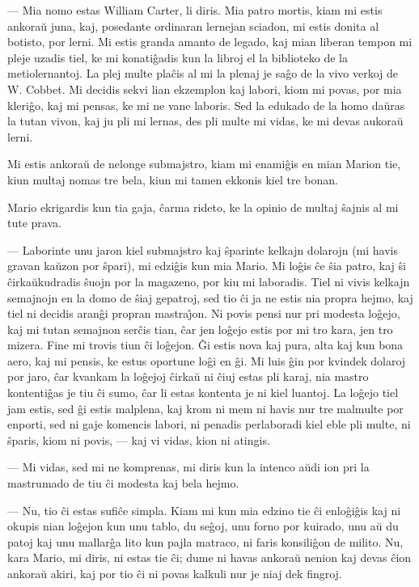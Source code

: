  --- Mia nomo estas William Carter, li diris. Mia patro mortis, kiam
mi estis ankora\u u juna, kaj, posedante ordinaran lernejan sciadon,
mi estis donita al botisto, por lerni. Mi estis granda amanto de
legado, kaj mian liberan tempon mi pleje uzadis tiel, ke mi
konati\^gadis kun la libroj el la biblioteko de la metiolernantoj.
La plej multe pla\^cis al mi la plenaj je sa\^go de la vivo verkoj
de W. Cobbet. Mi decidis sekvi lian ekzemplon kaj labori, kiom mi
povas, por mia kleri\^go, kaj mi pensas, ke mi ne vane laboris. Sed
la edukado de la homo da\u uras la tutan vivon, kaj ju pli mi
lernas, des pli multe mi vidas, ke mi devas aukora\u u lerni.

   Mi estis ankora\u u de nelonge submajstro, kiam mi enami\^gis en mian
Marion tie, kiun multaj nomas tre bela, kiun mi tamen ekkonis kiel
tre bonan.

   Mario ekrigardis kun tia gaja, \^carma rideto, ke la opinio de multaj
\^sajnis al mi tute prava.

 --- Laborinte unu jaron kiel submajstro kaj \^sparinte kelkajn dolarojn
(mi havis gravan ka\u uzon por \^spari), mi edzi\^gis kun mia Mario.
Mi lo\^gis \^ce \^sia patro, kaj \^si \^cirka\u ukudradis \^suojn
por la magazeno, por kiu mi laboradis. Tiel ni vivis kelkajn
semajnojn en la domo de \^siaj gepatroj, sed tio \^ci ja ne estis
nia propra hejmo, kaj tiel ni decidis aran\^gi propran
mastra\^{\j}on. Ni povis pensi nur pri modesta lo\^gejo, kaj mi
tutan semajnon ser\^cis tian, \^car jen lo\^gejo estis por mi tro
kara, jen tro mizera. Fine mi trovis tiun \^ci lo\^gejon. \^Gi estis
nova kaj pura, alta kaj kun bona aero, kaj mi pensis, ke estus
oportune lo\^gi en \^gi. Mi luis \^gin por kvindek dolaroj por jaro,
\^car kvankam la lo\^gejoj \^cirka\u u ni \^ciuj estas pli karaj,
nia mastro kontenti\^gas je tiu \^ci sumo, \^car li estas kontenta
je ni kiel luantoj. La lo\^gejo tiel jam estis, sed \^gi estis
malplena, kaj krom ni mem ni havis nur tre malmulte por enporti, sed
ni gaje komencis labori, ni penadis perlaboradi kiel eble pli multe,
ni \^sparis, kiom ni povis, --- kaj vi vidas, kion ni atingis.

 --- Mi vidas, sed mi ne komprenas, mi diris kun la intenco a\u udi ion
pri la mastrumado de tiu \^ci modesta kaj bela hejmo.

 --- Nu, tio \^ci estas sufi\^ce simpla. Kiam mi kun mia edzino tie \^ci
enlo\^gi\^gis kaj ni okupis nian lo\^gejon kun unu tablo, du
se\^goj, unu forno por kuirado, unu a\u u du patoj kaj unu
mallar\^ga lito kun pajla matraco, ni faris konsili\^gon de milito.
Nu, kara Mario, mi diris, ni estas tie \^ci; dume ni havas ankora\u
u nenion kaj devas \^cion ankora\u u akiri, kaj por tio \^ci ni
povas kalkuli nur je niaj dek fingroj.

